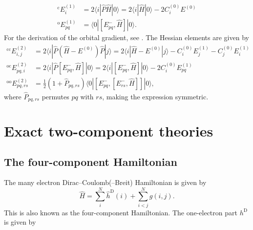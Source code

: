 \documentclass{article}
\begin{document}
\begin{align}
^{\mathrm{c}}E_i^{(1)}&=2\langle i| \hat{P}\hat{H}|0\rangle=2\langle i|\hat{H}|0\rangle-2C_i^{(0)}E^{(0)}\\
^{\mathrm{o}}E_{pq}^{(1)}&=\langle 0 |[E_{pq}^-,\hat{H}]|0\rangle.
\end{align}
For the derivation of the orbital gradient, see \cite[eq. 10.1.25 and eq. 10S.1.6]{helgakerMolecularElectronicStructure2000}. The Hessian elements are given by
\begin{align}
^{\mathrm{cc}}E_{i,j}^{(2)}&=2\langle i|\hat{P}(\hat{H}-E^{(0)})\hat{P}|j\rangle=2\langle i |\hat{H}-E^{(0)}|j\rangle-C_i^{(0)}E_j^{(1)}-C_j^{(0)}E_i^{(1)}\\
^{\mathrm{oc}}E_{pq,i}^{(2)}&=2\langle i |\hat{P}[E^-_{pq},\hat{H}]|0\rangle=2\langle i |[E^-_{pq},\hat{H}]|0\rangle-2C_i^{(0)}E_{pq}^{(1)}\\
^{\mathrm{oo}}E_{pq,rs}^{(2)}&=\frac{1}{2}(1+\hat{P}_{pq,rs})\langle 0 |[E_{pq}^-,[E_{rs}^-,\hat{H}]]|0\rangle,
\end{align}
where $\hat{P}_{pq,rs}$ permutes $pq$ with $rs$, making the expression symmetric.


\section{Exact two-component theories}
\subsection{The four-component Hamiltonian}
The many electron Dirac--Coulomb(--Breit) Hamiltonian \cite[eq. 9.1, p. 335]{reiherRelativisticQuantumChemistry2014} is given by
\begin{equation}
    \hat{H} = \sum_{i}^N\hat{h}^{\mathrm{D}}(i) + \sum_{i<j}^Ng(i,j).
\end{equation}
This is also known as the four-component Hamiltonian. The one-electron part $h^{\mathrm{D}}$ is given by
\end{document}
